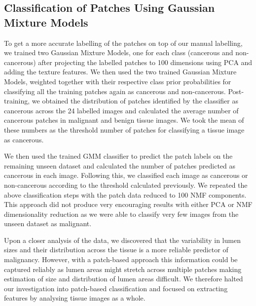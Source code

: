 \subsection{Classification of Patches Using Gaussian Mixture Models}
To get a more accurate labelling of the patches on top of our manual labelling, we trained two Gaussian Mixture Models, one for each class (cancerous and non-cancerous) after projecting the labelled patches to 100 dimensions using PCA and adding the texture features. We then used the two trained Gaussian Mixture Models, weighted together with their respective class prior probabilities for classifying all the training patches again as cancerous and non-cancerous. Post-training, we obtained the distribution of patches identified by the classifier as cancerous across the 24 labelled images and calculated the average number of cancerous patches in malignant and benign tissue images. We took the mean of these numbers as the threshold number of patches for classifying a tissue image as cancerous.

We then used the trained GMM classifier to predict the patch labels on the remaining unseen dataset and calculated the number of patches predicted as cancerous in each image. Following this, we classified each image as cancerous or non-cancerous according to the threshold calculated previously. We repeated the above classification steps with the patch data reduced to 100 NMF components. This approach did not produce very encouraging results with either PCA or NMF dimensionality reduction as we were able to classify very few images from the unseen dataset as malignant.

Upon a closer analysis of the data, we discovered that the variability in lumen sizes and their distribution across the tissue is a more reliable predictor of malignancy. However, with a patch-based approach this information could be captured reliably as lumen areas might stretch across multiple patches making estimation of size and distribution of lumen areas difficult. We therefore halted our investigation into patch-based classification and focused on extracting features by analysing tissue images as a whole.



 

